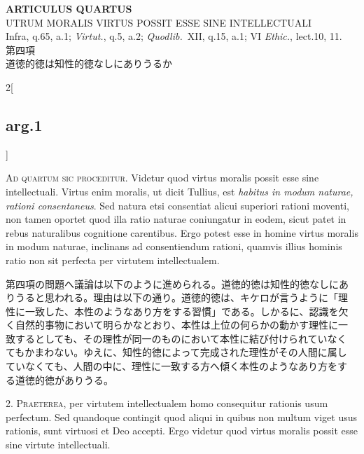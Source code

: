 \documentclass[paper=a4paper,fontsize=10pt,jafontsize=9pt,titlepage]{jlreq}
\begin{document}
\begin{center}
{\Large {\bfseries ARTICULUS QUARTUS}}\\
{\large UTRUM MORALIS VIRTUS POSSIT ESSE SINE INTELLECTUALI}\\
{\footnotesize Infra, q.65, a.1; {\itshape Virtut.}, q.5, a.2; {\itshape Quodlib.}~XII, q.15, a.1; VI {\itshape Ethic.}, lect.10, 11.}\\
{\Large 第四項\\道徳的徳は知性的徳なしにありうるか}
\end{center}

\begin{paracol}{2}[\subsection{arg.1}]

{\scshape Ad quartum sic proceditur}. Videtur quod virtus moralis
possit esse sine intellectuali. Virtus enim moralis, ut dicit Tullius,
est {\itshape habitus in modum naturae, rationi consentaneus}. Sed
natura etsi consentiat alicui superiori rationi moventi, non tamen
oportet quod illa ratio naturae coniungatur in eodem, sicut patet in
rebus naturalibus cognitione carentibus. Ergo potest esse in homine
virtus moralis in modum naturae, inclinans ad consentiendum rationi,
quamvis illius hominis ratio non sit perfecta per virtutem
intellectualem.

\switchcolumn

第四項の問題へ議論は以下のように進められる。道徳的徳は知性的徳なしにあ
りうると思われる。理由は以下の通り。道徳的徳は、キケロが言うように「理
性に一致した、本性のようなあり方をする習慣」である。しかるに、認識を欠
く自然的事物において明らかなとおり、本性は上位の何らかの動かす理性に一
致するとしても、その理性が同一のものにおいて本性に結び付けられていなく
てもかまわない。ゆえに、知性的徳によって完成された理性がその人間に属し
ていなくても、人間の中に、理性に一致する方へ傾く本性のようなあり方をす
る道徳的徳がありうる。


2. {\scshape Praeterea}, per virtutem intellectualem homo consequitur
rationis usum perfectum. Sed quandoque contingit quod aliqui in quibus
non multum viget usus rationis, sunt virtuosi et Deo accepti. Ergo
videtur quod virtus moralis possit esse sine virtute intellectuali.


\end{paracol}
\end{document}
